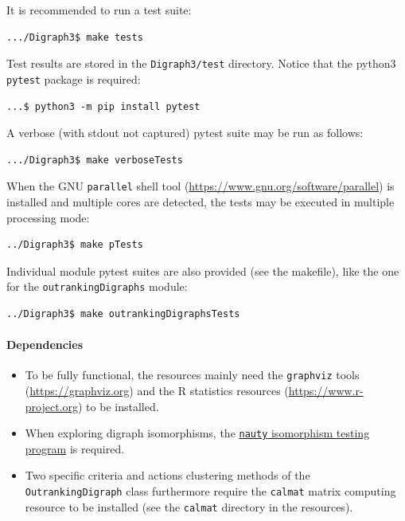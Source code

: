 It is recommended to run a test suite:
\begin{scriptsize}
\begin{verbatim}
.../Digraph3$ make tests
\end{verbatim}
\end{scriptsize}
Test results are stored in the \texttt{Digraph3/test} directory. Notice that the python3 \texttt{pytest} package is required:
\begin{scriptsize}
\begin{verbatim}
...$ python3 -m pip install pytest
\end{verbatim}
\end{scriptsize}
A verbose (with stdout not captured) pytest suite may be run as follows:
\begin{scriptsize}
\begin{verbatim}
.../Digraph3$ make verboseTests
\end{verbatim}
\end{scriptsize}
When the GNU \texttt{parallel} shell tool (\href{https://www.gnu.org/software/parallel}{https://www.gnu.org/software/parallel}) is installed and multiple cores are detected, the tests may be executed in multiple processing mode:
\begin{scriptsize}
\begin{verbatim}
../Digraph3$ make pTests 
\end{verbatim}
\end{scriptsize}
Individual module pytest suites are also provided (see the makefile), like the one for the \texttt{outrankingDigraphs} module:
\begin{scriptsize}
\begin{verbatim}
../Digraph3$ make outrankingDigraphsTests
\end{verbatim}
\end{scriptsize}

\paragraph{Dependencies}
\begin{itemize}
\item To be fully functional, the \Digraph resources mainly need the \texttt{graphviz} tools (\href{https://graphviz.org}{https://graphviz.org}) and the R statistics resources (\href{https://www.r-project.org}{https://www.r-project.org}) to be installed.
\item When exploring digraph isomorphisms, the \href{https://www.cs.sunysb.edu/~algorith/implement/nauty/implement.shtml}{\texttt{nauty} isomorphism testing program} is required.
\item Two specific criteria and actions clustering methods of the \texttt{OutrankingDigraph} class furthermore require the \texttt{calmat} matrix computing resource to be installed (see the \texttt{calmat} directory in the \Digraph resources).
\end{itemize}

